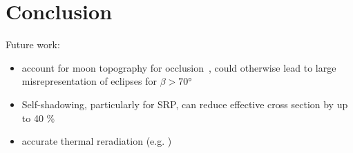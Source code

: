 \section{Conclusion}

Future work:
\begin{itemize}
    \item account for moon topography for occlusion~\cite{Mazarico2018}, could otherwise lead to large misrepresentation of eclipses for $\beta > \ang{70}$
    \item Self-shadowing, particularly for SRP, can reduce effective cross section by up to 40
    \%~\cite{Mazarico2018}
    \item accurate thermal reradiation (e.g. \cite{Marshall1994})
\end{itemize}


